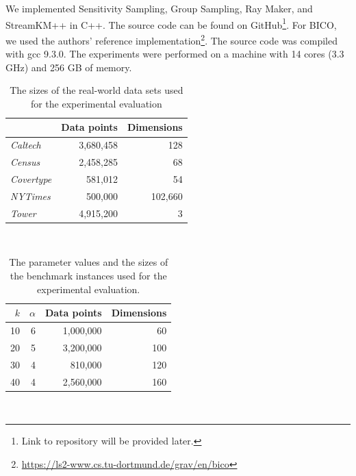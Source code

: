 We implemented Sensitivity Sampling, Group Sampling, Ray Maker, and StreamKM++ in C++. The source code can be found on GitHub\footnote{Link to repository will be provided later.}. For BICO, we used the authors' reference implementation\footnote{\url{https://ls2-www.cs.tu-dortmund.de/grav/en/bico}}. The source code was compiled with gcc 9.3.0. The experiments were performed on a machine with 14 cores (3.3 GHz) and 256 GB of memory.





%
\begin{table}
	\begin{center}%
	\caption{The sizes of the real-world data sets used for the experimental evaluation}
	\label{tab:real-world-datasets-overview}
	\begin{tabular}{lrr}
		\toprule
        
		    & Data points
		    & Dimensions
            \\
		\midrule
		\textit{Caltech}
    		& 3,680,458
    		& 128
    		\\
		\textit{Census}
    		& 2,458,285
    		& 68
    		\\
	    \textit{Covertype}
    	    & 581,012
    		& 54
    		\\
	    \textit{NYTimes}
    	    & 500,000
    		& 102,660
    		\\
        \textit{Tower}
            & 4,915,200
    		& 3
    		\\
		\bottomrule
	\end{tabular}\\
	\end{center}
\end{table}



%
\begin{table}
	\begin{center}%
	\caption{The parameter values and the sizes of the benchmark instances used for the experimental evaluation.}
	\label{tab:benchmark-instances-overview}
	\begin{tabular}{rrrr}
		\toprule
        $k$
		    & $\alpha$
		    & Data points
		    & Dimensions
            \\
		\midrule
        10
    		& 6
    		& 1,000,000
    		& 60
    		\\
        20
    		& 5
    		& 3,200,000
    		& 100
    		\\
        30
    		& 4
    		& 810,000
    		& 120
    		\\
        40
    		& 4
    		& 2,560,000
    		& 160
    		\\
		\bottomrule
	\end{tabular}\\
	\end{center}
\end{table}



